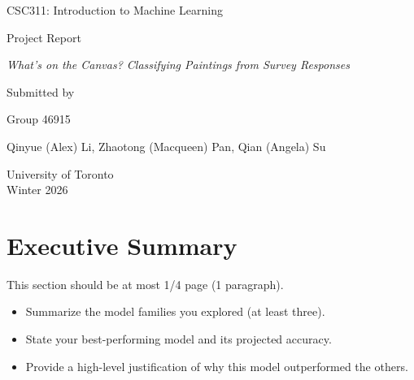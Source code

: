 \documentclass[12pt]{article}
\begin{document}
\begin{titlepage}
    \centering
    \vspace*{3cm}

    {\Large {CSC311: Introduction to Machine Learning} \par}
    \vspace{1cm}
    
    {\Large {Project Report} \par}
    \vspace{1cm}
    
    {\large \textit{What's on the Canvas? Classifying Paintings from Survey Responses} \par}
    \vspace{3cm}
    
    {\large Submitted by \par}
    
    \vspace{0.5cm}
    {\large Group 46915}
    
    \vspace{0.5cm}
    {\large Qinyue (Alex) Li, Zhaotong (Macqueen) Pan, Qian (Angela) Su \par}
    
    \vfill
    {\large University of Toronto \\ Winter 2026 \par}
\end{titlepage}
\clearpage
\setcounter{page}{1}

\section{Executive Summary}

This section should be at most 1/4 page (1 paragraph).

\begin{itemize}
  \item Summarize the model families you explored (at least three).  
  \item State your best-performing model and its projected accuracy.  
  \item Provide a high-level justification of why this model outperformed the others.  
\end{itemize}

\newpage

\end{document}
